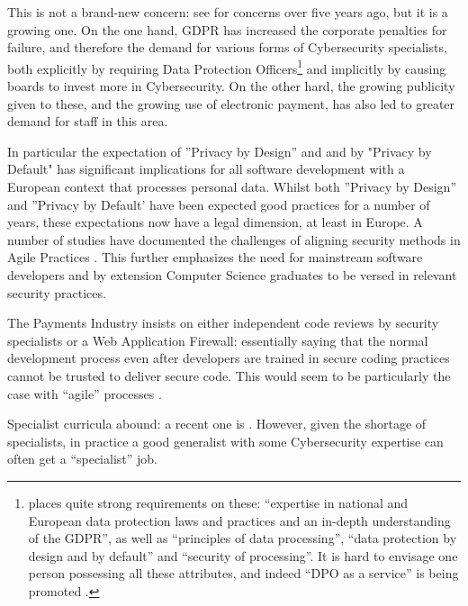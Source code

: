 \documentclass[conference]{IEEEtran}
\begin{document}
This is not a brand-new concern: see \cite{Parr2014a} for concerns over five years ago, but it is a growing one. On the one hand, GDPR has increased the corporate penalties for failure, and therefore the demand for various forms of Cybersecurity specialists, both explicitly by requiring Data Protection Officers\footnote{\cite{EU292016a} places quite strong requirements on these: ``expertise in national and European data protection laws and practices and an in-depth understanding of the GDPR'', as well as ``principles of data processing'', ``data protection by design and by default'' and ``security of processing''. It is hard to envisage one person possessing all these attributes, and indeed ``DPO as a service'' is being promoted \cite{McCreanor2018d}.} and implicitly by causing boards to invest more in Cybersecurity. On the other hard, the growing publicity given to these, and the growing use of electronic payment, has also led to greater demand for staff in this area.


In particular the expectation of ''Privacy by Design'' and and by "Privacy by Default" has significant implications for all software development with a European context that processes personal data. Whilst both ''Privacy by Design'' and ''Privacy by Default' have been expected good practices for a number of years, these expectations now have a legal dimension, at least in Europe. A number of studies have documented the challenges of aligning security methods in Agile Practices \cite{vanderHeijden:2018:EPS:3239235.3267426}. This further emphasizes the need for mainstream software developers and by extension Computer Science graduates to be versed in relevant security practices.

The Payments Industry \cite[6.6]{PCI2018b} insists on either independent code reviews by security specialists or a Web Application Firewall: essentially saying that the normal development process even after developers are trained in secure coding practices \cite[6.5]{PCI2018b} cannot be trusted to deliver secure code. This would seem to be particularly the case with ``agile'' processes \cite{Bartsch2011a}.

Specialist curricula abound: a recent one is \cite{ACMIEEEAISSIGSECIFIP}. However, given the shortage of specialists, in practice a good generalist with some Cybersecurity expertise can often get a ``specialist'' job.
\end{document}
